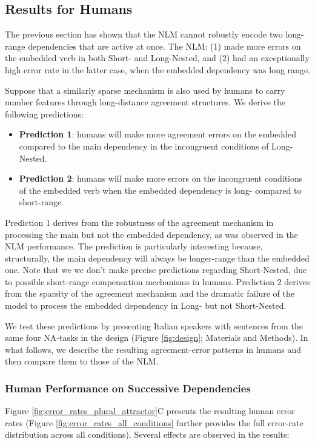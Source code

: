 \subsection{Results for Humans}
The previous section has shown that the NLM cannot robustly encode two long-range dependencies that are active at once. The NLM: (1) made more errors on the embedded verb in both Short- and Long-Nested, and (2) had an exceptionally high error rate in the latter case, when the embedded dependency was long range.

Suppose that a similarly sparse mechanism is also used by humans to carry number features through long-distance agreement structures. We derive the following predictions:

\begin{itemize}
    \item \textbf{Prediction 1}: humans will make more agreement errors on the embedded compared to the main dependency in the incongruent conditions of Long-Nested. 
    \item \textbf{Prediction 2}: humans will make more errors on the incongruent conditions of the embedded verb when the embedded dependency is long- compared to short-range.
\end{itemize}

Prediction 1 derives from the robustness of the agreement mechanism in processing the main but not the embedded dependency, as was observed in the NLM performance. The prediction is particularly interesting because, structurally, the main dependency will always be longer-range than the embedded one. Note that we we don't make precise predictions regarding Short-Nested, due to possible short-range compensation mechanisms in humans. Prediction 2 derives from the sparsity of the agreement mechanism and the dramatic failure of the model to process the embedded dependency in Long- but not Short-Nested. 

We test these predictions by presenting Italian speakers with sentences from the same four NA-tasks in the design (Figure \ref{fig:design}; Materials and Methods). In what follows, we describe the resulting agreement-error patterns in humans and then compare them to those of the NLM.

\subsubsection{Human Performance on Successive Dependencies}
Figure \ref{fig:error_rates_plural_attractor}C presents the resulting human error rates (Figure \ref{fig:error_rates_all_conditions} further provides the full error-rate distribution across all conditions). Several effects are observed in the results: 

